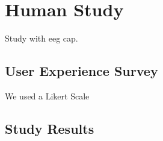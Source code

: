 \chapter{Human Study}\label{ch:human_study}
Study with eeg cap.
\section{User Experience Survey}
We used a Likert Scale \cite{likert1932technique}

\section{Study Results}

